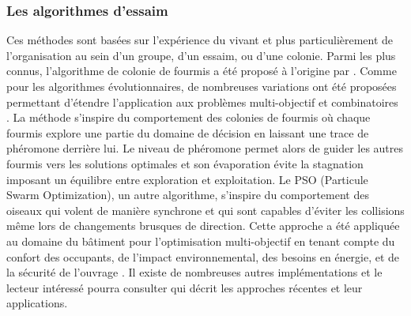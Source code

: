 \subsubsection{Les algorithmes d’essaim} %
\label{ssub:les_algorithmes_d_essaim}
Ces méthodes sont basées sur l’expérience du vivant et plus particulièrement de
l’organisation au sein d’un groupe, d’un essaim, ou d’une colonie. Parmi les plus connus,
l’algorithme de colonie de fourmis a été proposé à l’origine par \cite{Colorni1992509}.
Comme pour les algorithmes évolutionnaires, de nombreuses variations ont été proposées
permettant d’étendre l’application aux problèmes multi-objectif et combinatoires
\parencite{MichaelGuntsch2003,Shea2006627}.
La méthode s’inspire du comportement des colonies de fourmis où chaque fourmis
explore une partie du domaine de décision en laissant une trace de phéromone derrière lui.
Le niveau de phéromone permet alors de guider les autres fourmis vers les solutions
optimales et son évaporation évite la stagnation imposant un équilibre entre exploration
et exploitation.
Le PSO (Particule Swarm Optimization), un autre algorithme, s’inspire du comportement des oiseaux
qui volent de manière synchrone et qui sont capables d’éviter les collisions même lors
de changements brusques de direction. Cette approche a été appliquée au domaine
du bâtiment pour l’optimisation multi-objectif en tenant compte du confort des occupants,
de l’impact environnemental, des besoins en énergie, et de la sécurité de l’ouvrage \parencite{Armand-Decker2015}.
Il existe de nombreuses autres implémentations et le lecteur intéressé pourra consulter
\cite{Aboul-EllaHassanien2015} qui décrit les approches récentes et leur applications.


